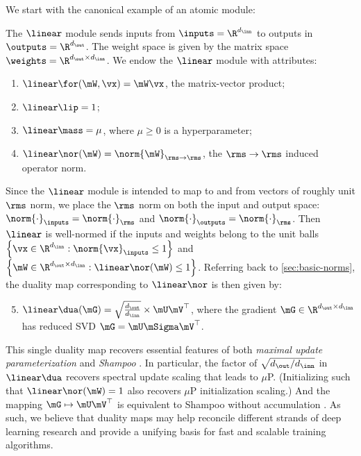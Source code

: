 We start with the canonical example of an atomic module:
\begin{myexample} The $\linear$ module sends inputs from $\inputs = \R^{d_\inn}$ to outputs in $\outputs = \R^{d_\out}$. The weight space is given by the matrix space $\weights = \R^{d_\out \times d_\inn}$. We endow the $\linear$ module with attributes:

\begin{enumerate}
    \setlength\itemsep{0em}
    \item $\linear\for(\mW,\vx) = \mW\vx$, the matrix-vector product;
    \item $\linear\lip = 1$;
    \item $\linear\mass = \mu$, where $\mu\geq 0$ is a hyperparameter;
    \item $\linear\nor(\mW) = \norm{\mW}_{\rms\to\rms}$, the $\rms\to\rms$ induced operator norm.
\end{enumerate}
Since the $\linear$ module is intended to map to and from vectors of roughly unit $\rms$ norm, we place the $\rms$ norm on both the input and output space: $\norm{\cdot}_\inputs = \norm{\cdot}_\rms$ and $\norm{\cdot}_\outputs = \norm{\cdot}_\rms$. Then $\linear$ is well-normed if the inputs and weights belong to the unit balls $\left\{\vx\in\R^{d_\inn}:\norm{\vx}_\inputs \leq 1\right\}$ and $\left\{\mW \in \R^{d_\out\times d_\inn}:\linear\nor(\mW)\leq1\right\}$. Referring back to \cref{sec:basic-norms}, the duality map corresponding to $\linear\nor$ is then given by:

\begin{enumerate}
\setcounter{enumi}{4}
\setlength\itemsep{0em}
    \item $\linear\dua(\mG) = \sqrt{\frac{d_\out}{d_\inn}} \times \mU\mV^\top$, where the gradient $\mG \in \R^{d_\out \times d_\inn}$ has reduced SVD $\mG = \mU \mSigma \mV^\top$.
\end{enumerate}
\end{myexample}

This single duality map recovers essential features of both \textit{maximal update parameterization} \citep[$\mu$P]{Yang2021TensorPI} and \textit{Shampoo} \citep{Gupta2018ShampooPS}. In particular, the factor of $\sqrt{d_\out / d_\inn}$ in $\linear\dua$ recovers spectral update scaling \citep{my-spectral} that leads to $\mu$P. (Initializing such that $\linear\nor(\mW)=1$ also recovers $\mu$P initialization scaling.) And the mapping $\mG \mapsto \mU\mV^\top$ is equivalent to Shampoo without accumulation \citep{bernstein2024old}. As such, we believe that duality maps may help reconcile different strands of deep learning research and provide a unifying basis for fast and scalable training algorithms.

